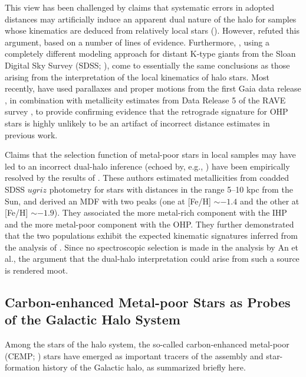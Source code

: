 \documentclass[iop]{emulateapj}
\begin{document}
This view has been challenged by claims that systematic errors in
adopted distances may artificially induce an apparent dual nature of the
halo for samples whose kinematics are deduced from relatively local
stars (\citealt{schonrich2011}). However, \citet{beers2012} refuted this
argument, based on a number of lines of evidence. Furthermore,
\citet{das2016}, using a completely different modeling approach for
distant K-type giants from the Sloan Digital Sky Survey (SDSS;
\citealt{york2000}), come to essentially the same conclusions as those
arising from the interpretation of the local kinematics of halo stars.
Most recently, \citet{helmi2017} have used parallaxes and proper motions
from the first Gaia data release \citep{gaia2016}, in combination with
metallicity estimates from Data Release 5 of the RAVE survey \citep{kunder2016}, to
provide confirming evidence that the retrograde signature for OHP stars
is highly unlikely to be an artifact of incorrect distance estimates in
previous work.

Claims that the selection function of metal-poor stars in local samples
may have led to an incorrect dual-halo inference (echoed by, e.g.,
\citealt{monachesi2016}) have been empirically resolved by the results
of \citet{an2013, an2015}. These authors estimated metallicities from
coadded SDSS $ugriz$ photometry for stars with distances in the range
5--10 kpc from the Sun, and derived an MDF with two peaks (one at [Fe/H]
$\sim -1.4$ and the other at [Fe/H] $\sim -1.9$). They associated the
more metal-rich component with the IHP and the more metal-poor component
with the OHP. They further demonstrated that the two populations exhibit
the expected kinematic signatures inferred from the analysis of
\citet{carollo2007, carollo2010}. Since no spectroscopic selection is
made in the analysis by An et al., the argument that the dual-halo
interpretation could arise from such a source is rendered moot.

\subsection{Carbon-enhanced Metal-poor Stars as Probes of the Galactic
Halo System}

Among the stars of the halo system, the so-called carbon-enhanced
metal-poor (CEMP; \citealt{beers2005}) stars have emerged as important
tracers of the assembly and star-formation history of the Galactic halo,
as summarized briefly here.
\end{document}

